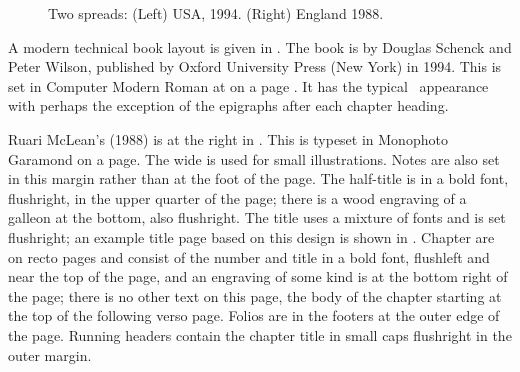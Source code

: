 \documentclass[10pt,letterpaper,extrafontsizes]{memoir}
\begin{document}
\begin{figure}
\centering
\begin{minipage}[b]{\pwlayi}
\end{minipage}
\hfill
\begin{minipage}[b]{\pwlayi}
\end{minipage}
\caption[Two spreads: USA, 1994 and England, 1988]%
        {Two spreads: (Left) USA, 1994.
         (Right) England 1988.} \label{fb:7}
\end{figure}

\enlargethispage{\baselineskip}


    A modern technical book layout is given in . The book
is  by Douglas Schenck and Peter
Wilson, published by Oxford University Press (New York) in 1994. This is
set in Computer Modern Roman at  
on a page . 
It has the typical \ltx\ appearance with perhaps the exception of the
epigraphs after each chapter heading.



Ruari McLean's  (1988) is at the right in . This is typeset in  
Monophoto Garamond 
on a  page. The wide
\foredge{} is used for small illustrations. 
Notes are also set in this
margin rather than at the foot of the page.
The half-title 
is in a bold font, flushright, in the 
upper quarter of the page; there is a wood engraving of a galleon at the 
bottom, also flushright. The title uses a mixture of fonts
and is set flushright; an example title page based on this design is shown
in . Chapter are on recto
pages and consist of the number and title in a bold font, flushleft and near
the top of the page, and an engraving of some kind is at the bottom
right of the page; there is no other text on this page, the body of
the chapter starting at the top of the following verso page. 
Folios are in the footers at the outer edge
of the page. Running headers contain the chapter
title in small caps flushright in the outer margin.
\end{document}
